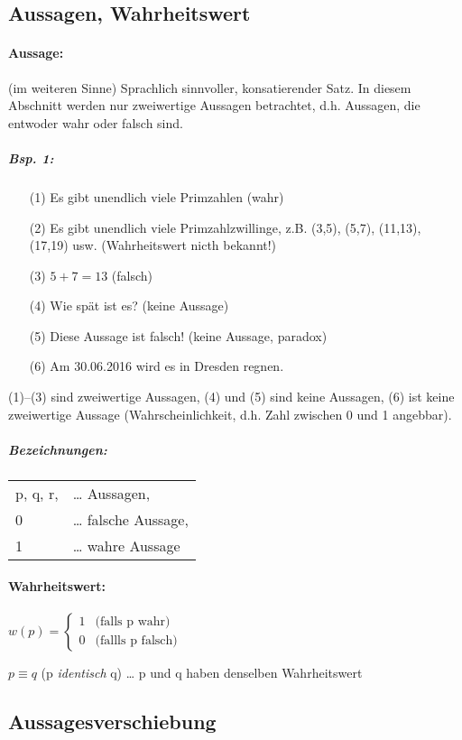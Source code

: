\subsection{Aussagen, Wahrheitswert}

\paragraph{Aussage:} (im weiteren Sinne) Sprachlich sinnvoller, konsatierender Satz. In diesem Abschnitt werden nur zweiwertige Aussagen betrachtet, d.h. Aussagen, die entwoder wahr oder falsch sind.

\subparagraph{Bsp. 1:} 
\begin{itemize}
\item[(1)] Es gibt unendlich viele Primzahlen (wahr)
\item[(2)] Es gibt unendlich viele Primzahlzwillinge, z.B. (3,5), (5,7), (11,13), (17,19) usw. (Wahrheitswert nicth bekannt!)
\item[(3)] $5+7=13$ (falsch)
\item[(4)] Wie spät ist es? (keine Aussage)
\item[(5)] Diese Aussage ist falsch! (keine Aussage, paradox)
\item[(6)] Am 30.06.2016 wird es in Dresden regnen.
\end{itemize}

(1)--(3) sind zweiwertige Aussagen, (4) und (5) sind keine Aussagen, (6) ist keine zweiwertige Aussage (Wahrscheinlichkeit, d.h. Zahl zwischen 0 und 1 angebbar).

\subparagraph{Bezeichnungen:} \parskp
\begin{tabular}{l l}
p, q, r, &… Aussagen,\\
0 &… falsche Aussage, \\
1 &… wahre Aussage\\
\end{tabular}

\paragraph{Wahrheitswert:} \parskp
$w(p)=\begin{cases}
1 & \text{(falls p wahr)} \\
0 & \text{(fallls p falsch)}
\end{cases}$
    
$p \equiv q$ (p \emph{identisch} q) … p und q haben denselben Wahrheitswert
    
\subsection{Aussagesverschiebung}

